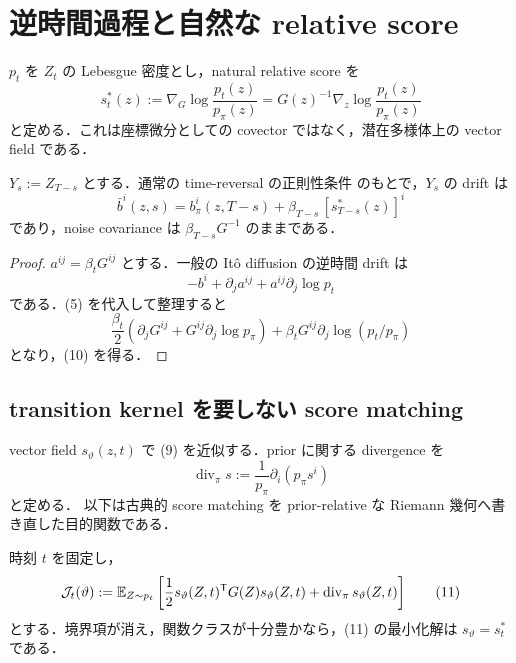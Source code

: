 \documentclass[uplatex,dvipdfmx,11pt,a4paper]{jsarticle}
\begin{document}
\section{逆時間過程と自然な relative score}
\label{sec:score}

$p_t$ を $Z_t$ の Lebesgue 密度とし，natural relative score を
\[
  s_t^*(z)
  :=\nabla_G\log\frac{p_t(z)}{p_\pi(z)}
  =G(z)^{-1}\nabla_z\log\frac{p_t(z)}{p_\pi(z)}
  \tag{9}
\]
と定める．これは座標微分としての covector ではなく，潜在多様体上の vector field
である．

\begin{proposition}
\label{prop:reverse}
  $Y_s:=Z_{T-s}$ とする．通常の time-reversal の正則性条件
  \cite{haussmann1986} のもとで，$Y_s$ の drift は
  \[
    \boxed{
      \bar b^i(z,s)
      =b_\pi^i(z,T-s)+\beta_{T-s}\,[s_{T-s}^*(z)]^i
    }
    \tag{10}
  \]
  であり，noise covariance は $\beta_{T-s}G^{-1}$ のままである．
\end{proposition}

\begin{proof}
  $a^{ij}=\beta_tG^{ij}$ とする．一般の It\^o diffusion の逆時間 drift は
  \[
    -b^i+\partial_ja^{ij}+a^{ij}\partial_j\log p_t
  \]
  である．(5) を代入して整理すると
  \[
    \frac{\beta_t}{2}
    (\partial_jG^{ij}+G^{ij}\partial_j\log p_\pi)
    +\beta_tG^{ij}\partial_j\log(p_t/p_\pi)
  \]
  となり，(10) を得る．
\end{proof}

\subsection{transition kernel を要しない score matching}

vector field $s_\vartheta(z,t)$ で (9) を近似する．prior に関する divergence を
\[
  \operatorname{div}_\pi s
  :=\frac{1}{p_\pi}\partial_i(p_\pi s^i)
\]
と定める．
以下は古典的 score matching \cite{hyvarinen2005} を prior-relative な
Riemann 幾何へ書き直した目的関数である．

\begin{proposition}
\label{prop:score-matching}
  時刻 $t$ を固定し，
  \[
    \mathcal{J}_t(\vartheta)
    :=\mathbb{E}_{Z\sim p_t}
      \left[
        \frac12s_\vartheta(Z,t)^{\mathsf T}G(Z)s_\vartheta(Z,t)
        +\operatorname{div}_\pi s_\vartheta(Z,t)
      \right]
    \tag{11}
  \]
  とする．境界項が消え，関数クラスが十分豊かなら，(11) の最小化解は
  $s_\vartheta=s_t^*$ である．
\end{proposition}
\end{document}
